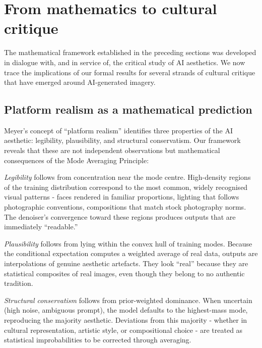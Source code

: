 \documentclass[11pt]{article}
\begin{document}
\section{From mathematics to cultural critique}\label{sec:culture}

The mathematical framework established in the preceding sections was developed in dialogue with, and in service of, the critical study of AI aesthetics. We now trace the implications of our formal results for several strands of cultural critique that have emerged around AI-generated imagery.

\subsection{Platform realism as a mathematical prediction}

Meyer's concept of ``platform realism'' \citep{Meyer2025} identifies three properties of the AI aesthetic: legibility, plausibility, and structural conservatism. Our framework reveals that these are not independent observations but mathematical consequences of the Mode Averaging Principle:

\textit{Legibility} follows from concentration near the mode centre. High-density regions of the training distribution correspond to the most common, widely recognised visual patterns - faces rendered in familiar proportions, lighting that follows photographic conventions, compositions that match stock photography norms. The denoiser's convergence toward these regions produces outputs that are immediately ``readable.''

\textit{Plausibility} follows from lying within the convex hull of training modes. Because the conditional expectation computes a weighted average of real data, outputs are interpolations of genuine aesthetic artefacts. They look ``real'' because they are statistical composites of real images, even though they belong to no authentic tradition.

\textit{Structural conservatism} follows from prior-weighted dominance. When uncertain (high noise, ambiguous prompt), the model defaults to the highest-mass mode, reproducing the majority aesthetic. Deviations from this majority - whether in cultural representation, artistic style, or compositional choice - are treated as statistical improbabilities to be corrected through averaging.
\end{document}
